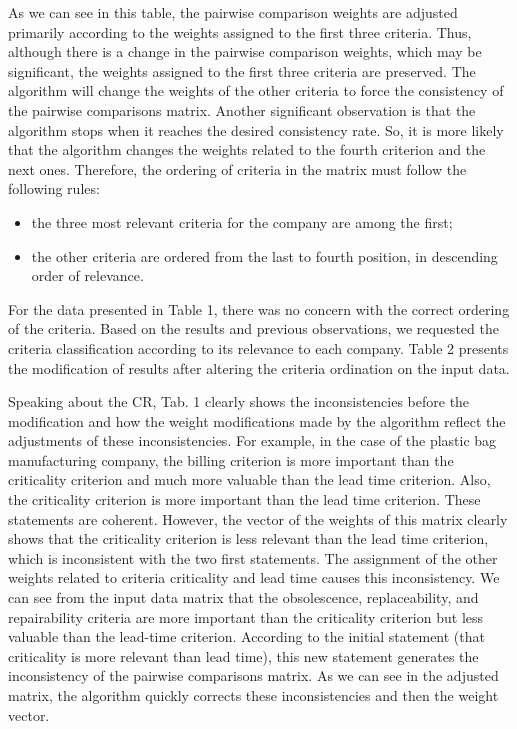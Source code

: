 \documentclass[10pt,fleqn,a4paper,twoside]{article}
\begin{document}
As we can see in this table, the pairwise comparison weights are adjusted primarily according to the weights assigned to the first three criteria. Thus, although there is a change in the pairwise comparison weights, which may be significant, the weights assigned to the first three criteria are preserved. The algorithm will change the weights of the other criteria to force the consistency of the pairwise comparisons matrix. Another significant observation is that the algorithm stops when it reaches the desired consistency rate. So, it is more likely that the algorithm changes the weights related to the fourth criterion and the next ones. Therefore, the ordering of criteria in the matrix must follow the following rules:

\begin{itemize}
\item the three most relevant criteria for the company are among the first;
\item the other criteria are ordered from the last to fourth position, in descending order of relevance.
\end{itemize}

For the data presented in Table 1, there was no concern with the correct ordering of the criteria. Based on the results and previous observations,  we requested the criteria classification according to its relevance to each company. Table 2 presents the modification of results after altering the criteria ordination on the input data.

Speaking about the CR, Tab. 1 clearly shows the inconsistencies before the modification and how the weight modifications made by the algorithm reflect the adjustments
of these inconsistencies. For example, in the case of the plastic bag manufacturing company, the billing criterion is more important than the criticality criterion and much more valuable than the lead time criterion. Also, the criticality criterion is more important than the lead time criterion. These statements are coherent. However, the vector of the weights of this matrix clearly shows that the criticality criterion is less relevant than the lead time criterion, which is inconsistent with the two first statements. The assignment of the other weights related to criteria criticality and lead time causes this inconsistency. We can see from the input data matrix that the obsolescence, replaceability, and repairability criteria are more important than the criticality criterion but less valuable than the lead-time criterion. According to the initial statement (that criticality is more relevant than lead time), this new statement generates the inconsistency of the pairwise comparisons matrix. As we can see in the adjusted matrix, the algorithm quickly corrects these inconsistencies and then the weight vector.
\end{document}
